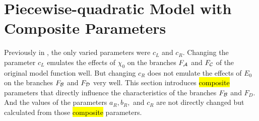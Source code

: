 \section{Piecewise-quadratic Model with Composite Parameters}
\label{sec:setup.quad.hyper}

Previously in , the only varied parameters were $c_L$ and $c_R$.
Changing the parameter $c_L$ emulates the effects of $\chi_0$ on the branches $F_{\mathcal{A}}$ and $F_{\mathcal{C}}$ of the original model function well.
But changing $c_R$ does not emulate the effects of $E_0$ on the branches $F_{\mathcal{B}}$ and $F_{\mathcal{D}}$ very well.
This section introduces \hl{composite} parameters that directly influence the characteristics of the branches $F_{\mathcal{B}}$ and $F_D$.
And the values of the parameters $a_R, b_R,$ and $c_R$ are not directly changed but calculated from those \hl{composite} parameters.




